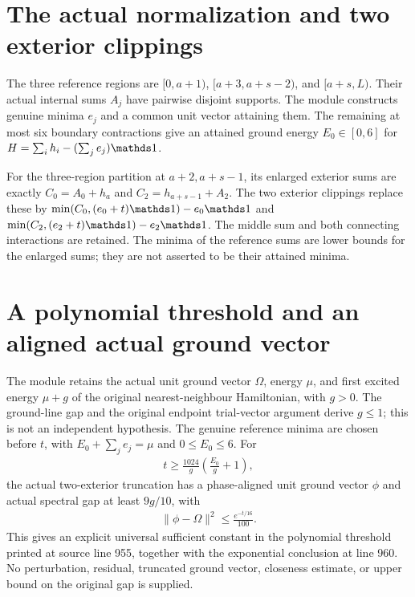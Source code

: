 \documentclass{article}
\begin{document}
\section{The actual normalization and two exterior clippings}

The three reference regions are
$[0,a+1)$, $[a+3,a+s-2)$, and $[a+s,L)$.
Their actual internal sums $A_j$ have pairwise disjoint supports. The
module  constructs genuine minima $e_j$
and a common unit vector attaining them. The remaining at most six boundary
contractions give an attained ground energy $E_0\in[0,6]$ for
$H=\sum_i h_i-(\sum_j e_j)\Id$.

For the three-region partition at $a+2,a+s-1$, its enlarged exterior sums
are exactly $C_0=A_0+h_a$ and $C_2=h_{a+s-1}+A_2$.
The two exterior clippings replace these by
$\min(C_0,(e_0+t)\Id)-e_0\Id$ and
$\min(C_2,(e_2+t)\Id)-e_2\Id$.
The middle sum and both connecting interactions are retained.
The minima of the reference sums are lower bounds for the enlarged sums;
they are not asserted to be their attained minima.

\section{A polynomial threshold and an aligned actual ground vector}

The module  retains the actual unit
ground vector $\Omega$, energy $\mu$, and first excited energy $\mu+g$
of the original nearest-neighbour Hamiltonian, with $g>0$.
The ground-line gap and the original endpoint trial-vector argument derive
$g\le1$; this is not an independent hypothesis.
The genuine reference minima are chosen before $t$, with
$E_0+\sum_j e_j=\mu$ and $0\le E_0\le6$.
For
\begin{align*}
 t\ge\frac{1024}{g}\left(\frac{E_0}{g}+1\right),
\end{align*}
the actual two-exterior truncation has a phase-aligned unit ground vector
$\phi$ and actual spectral gap at least $9g/10$, with
\begin{align*}
 \|\phi-\Omega\|^2\le\frac{e^{-t/16}}{100}.
\end{align*}
This gives an explicit universal sufficient constant in the polynomial
threshold printed at source line 955, together with the exponential
conclusion at line 960. No perturbation, residual, truncated ground vector,
closeness estimate, or upper bound on the original gap is supplied.
\end{document}
